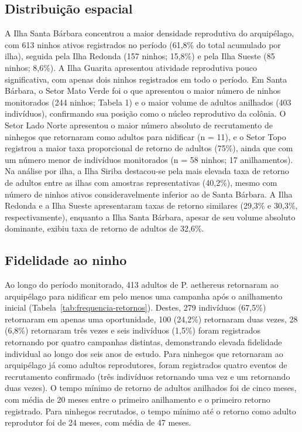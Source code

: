 \documentclass[11pt]{article}
\begin{document}
\subsection{Distribuição espacial}
A Ilha Santa Bárbara concentrou a maior densidade reprodutiva do arquipélago, com 613 ninhos ativos registrados no período (61,8\% do total acumulado por ilha), seguida pela Ilha Redonda (157 ninhos; 15,8\%) e pela Ilha Sueste (85 ninhos; 8,6\%). A Ilha Guarita apresentou atividade reprodutiva pouco significativa, com apenas dois ninhos registrados em todo o período.
Em Santa Bárbara, o Setor Mato Verde foi o que apresentou o maior número de ninhos monitorados (244 ninhos; Tabela 1) e o maior volume de adultos anilhados (403 indivíduos), confirmando sua posição como o núcleo reprodutivo da colônia. O Setor Lado Norte apresentou o maior número absoluto de recrutamento de ninhegos que retornaram como adultos para nidificar (n = 11), e o Setor Topo registrou a maior taxa proporcional de retorno de adultos (75\%), ainda que com um número menor de indivíduos monitorados (n = 58 ninhos; 17 anilhamentos).
Na análise por ilha, a Ilha Siriba destacou-se pela mais elevada taxa de retorno de adultos entre as ilhas com amostras representativas (40,2\%), mesmo com número de ninhos ativos consideravelmente inferior ao de Santa Bárbara. A Ilha Redonda e a Ilha Sueste apresentaram taxas de retorno similares (29,3\% e 30,3\%, respectivamente), enquanto a Ilha Santa Bárbara, apesar de seu volume absoluto dominante, exibiu taxa de retorno de adultos de 32,6\%.

\subsection{Fidelidade ao ninho}
Ao longo do período monitorado, 413 adultos de P. aethereus retornaram ao arquipélago para nidificar em pelo menos uma campanha após o anilhamento inicial (Tabela~\ref{tab:frequencia-retornos}). Destes, 279 indivíduos (67,5\%) retornaram em apenas uma oportunidade, 100 (24,2\%) retornaram duas vezes, 28 (6,8\%) retornaram três vezes e seis indivíduos (1,5\%) foram registrados retornando por quatro campanhas distintas, demonstrando elevada fidelidade individual ao longo dos seis anos de estudo.
Para ninhegos que retornaram ao arquipélago já como adultos reprodutores, foram registrados quatro eventos de recrutamento confirmado (três indivíduos retornando uma vez e um retornando duas vezes). O tempo mínimo de retorno de adultos anilhados foi de cinco meses, com média de 20 meses entre o primeiro anilhamento e o primeiro retorno registrado. Para ninhegos recrutados, o tempo mínimo até o retorno como adulto reprodutor foi de 24 meses, com média de 47 meses.
\end{document}
